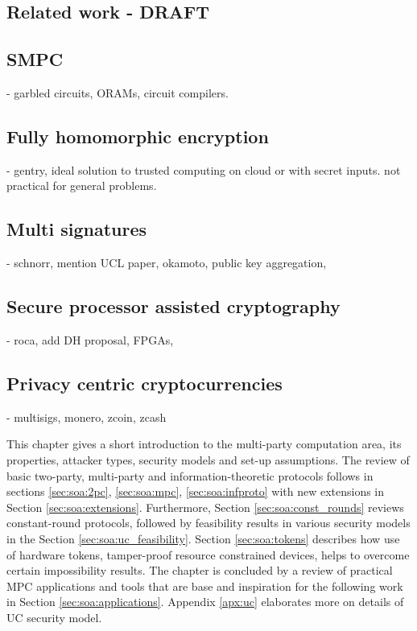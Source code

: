 \documentclass[
  digital, %
  twoside, %
  table,   %
  lof,     %
  lot,     %
]{fithesis3}
\newcounter{ph4_show_guides}
\theoremstyle{definition}
\theoremstyle{remark}
\begin{document}
\begin{ecmmnt}
\section{Related work - DRAFT}
    \subsection{SMPC}
    - garbled circuits, ORAMs, circuit compilers.
    
    \subsection{Fully homomorphic encryption}
    - gentry, ideal solution to trusted computing on cloud or with secret inputs. not practical for general problems.
    
    \subsection{Multi signatures}
    - schnorr, mention UCL paper, okamoto, public key aggregation,  
    
    \subsection{Secure processor assisted cryptography}
    - roca, add DH proposal, FPGAs, 
    
    \subsection{Privacy centric cryptocurrencies}
    - multisigs, monero, zcoin, zcash
\end{ecmmnt}

This chapter gives a short introduction to the multi-party computation area, its properties, attacker types, security models and set-up assumptions. The review of basic two-party, multi-party and information-theoretic protocols follows in sections \ref{sec:soa:2pc}, \ref{sec:soa:mpc}, \ref{sec:soa:infproto} with new extensions in Section \ref{sec:soa:extensions}. Furthermore, Section \ref{sec:soa:const_rounds} reviews constant-round protocols, followed by feasibility results in various security models in the Section \ref{sec:soa:uc_feasibility}. Section \ref{sec:soa:tokens} describes how use of hardware tokens, tamper-proof resource constrained devices, helps to overcome certain impossibility results. The chapter is concluded by a review of practical MPC applications and tools that are base and inspiration for the following work in Section \ref{sec:soa:applications}. Appendix \ref{apx:uc} elaborates more on details of UC security model.
\end{document}
